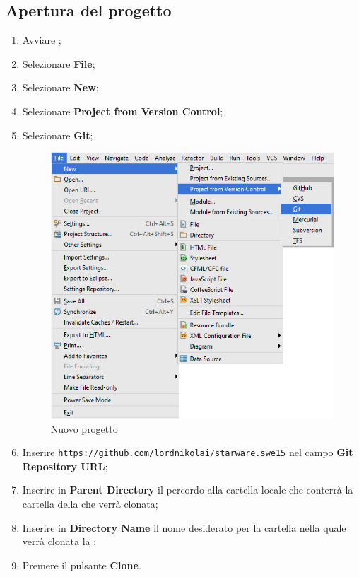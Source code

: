 \documentclass[12pt,a4paper]{article}
\begin{document}
	\subsection{Apertura del progetto}\label{nuovoProgetto}
	\begin{enumerate}
		\item Avviare  ;
		\item Selezionare \textbf{File};
		\item Selezionare \textbf{New};
		\item Selezionare \textbf{Project from Version Control};
		\item Selezionare \textbf{Git};

		\begin{center}
			\begin{figure}[H]
				\centering \includegraphics[max width=\textwidth]{../img/manualeSviluppatore/newProject.png}
				\caption{Nuovo progetto}
			\end{figure}
		\end{center}

		\item Inserire \texttt{https://github.com/lordnikolai/starware.swe15} nel campo \textbf{Git Repository URL}; 
		\item Inserire in \textbf{Parent Directory} il percordo alla cartella locale che conterrà la cartella della  che verrà clonata; 
		\item Inserire in \textbf{Directory Name} il nome desiderato per la cartella nella quale verrà clonata la ;
		\item Premere il pulsante \textbf{Clone}.
	\end{enumerate}
\end{document}
